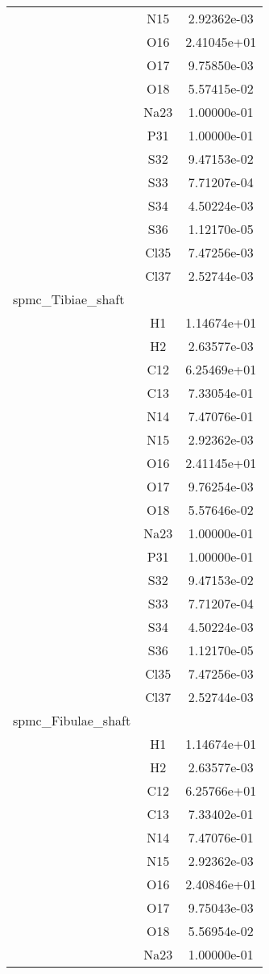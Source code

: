 \begin{centering}
\begin{longtable}{l c c}
& N15 & 2.92362e-03 \\ 
& O16 & 2.41045e+01 \\ 
& O17 & 9.75850e-03 \\ 
& O18 & 5.57415e-02 \\ 
& Na23 & 1.00000e-01 \\ 
& P31 & 1.00000e-01 \\ 
& S32 & 9.47153e-02 \\ 
& S33 & 7.71207e-04 \\ 
& S34 & 4.50224e-03 \\ 
& S36 & 1.12170e-05 \\ 
& Cl35 & 7.47256e-03 \\ 
& Cl37 & 2.52744e-03 \\ 
\hline
spmc_Tibiae_shaft & & \\
\hline
& H1 & 1.14674e+01 \\ 
& H2 & 2.63577e-03 \\ 
& C12 & 6.25469e+01 \\ 
& C13 & 7.33054e-01 \\ 
& N14 & 7.47076e-01 \\ 
& N15 & 2.92362e-03 \\ 
& O16 & 2.41145e+01 \\ 
& O17 & 9.76254e-03 \\ 
& O18 & 5.57646e-02 \\ 
& Na23 & 1.00000e-01 \\ 
& P31 & 1.00000e-01 \\ 
& S32 & 9.47153e-02 \\ 
& S33 & 7.71207e-04 \\ 
& S34 & 4.50224e-03 \\ 
& S36 & 1.12170e-05 \\ 
& Cl35 & 7.47256e-03 \\ 
& Cl37 & 2.52744e-03 \\ 
\hline
spmc_Fibulae_shaft & & \\
\hline
& H1 & 1.14674e+01 \\ 
& H2 & 2.63577e-03 \\ 
& C12 & 6.25766e+01 \\ 
& C13 & 7.33402e-01 \\ 
& N14 & 7.47076e-01 \\ 
& N15 & 2.92362e-03 \\ 
& O16 & 2.40846e+01 \\ 
& O17 & 9.75043e-03 \\ 
& O18 & 5.56954e-02 \\ 
& Na23 & 1.00000e-01 \\ 

\end{longtable}
\end{centering}
